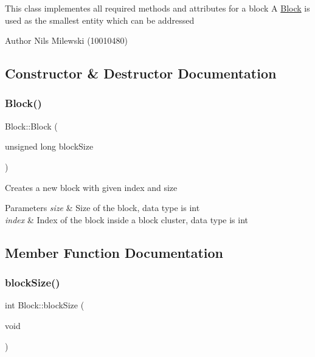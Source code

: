 This class implementes all required methods and attributes for a block A \mbox{\hyperlink{classlogic_1_1_block}{Block}} is used as the smallest entity which can be addressed \begin{DoxyAuthor}{Author}
Nils Milewski (10010480) 
\end{DoxyAuthor}


\subsection{Constructor \& Destructor Documentation}
\mbox{\label{classlogic_1_1_block_a893088c60b4c0c41370eb5df87b566d0}} 
\subsubsection{\texorpdfstring{Block()}{Block()}}
{\footnotesize\ttfamily Block\+::\+Block (\begin{DoxyParamCaption}\item[{unsigned long}]{block\+Size }\end{DoxyParamCaption})}

Creates a new block with given index and size


\begin{DoxyParams}{Parameters}
{\em size} & Size of the block, data type is int\\
\hline
{\em index} & Index of the block inside a block cluster, data type is int \\
\hline
\end{DoxyParams}


\subsection{Member Function Documentation}
\mbox{\label{classlogic_1_1_block_a0b57337ab5b3817a6509efd1a323c3eb}} 
\subsubsection{\texorpdfstring{block\+Size()}{blockSize()}}
{\footnotesize\ttfamily int Block\+::block\+Size (\begin{DoxyParamCaption}\item[{void}]{ }\end{DoxyParamCaption})}

